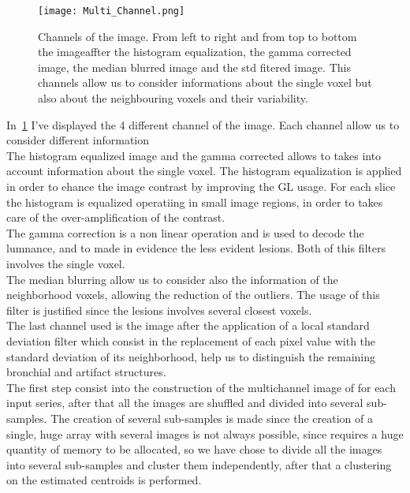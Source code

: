 		\begin{figure}[h]
			\centering
				\texttt{[image: Multi\_Channel.png]}
			\caption{Channels of the image. From left to right and from top to bottom the imageaffter the histogram equalization, the gamma corrected image, the median blurred image and the std fitered image. This channels allow us to consider informations about the single voxel but also about the neighbouring voxels and their variability. }\label{fig:MultiChannel}
		\end{figure}
	
		In \figurename\,\ref{fig:MultiChannel} I've displayed the 4 different channel of the image. Each channel allow us to consider different information\\
		The histogram equalized image and the gamma corrected allows to takes into account information about the single voxel. The histogram equalization is applied in order to ehance the image contrast by improving the GL usage. For each slice the histogram is equalized operatiing in small image regions, in order to takes care of the over-amplification of the contrast.\\ The gamma correction is a non linear operation and is used to decode the lumnance, and to made in evidence the less evident lesions. Both of this filters involves the single voxel.\\The median blurring allow us to consider also the information of the neighborhood voxels, allowing the reduction of the outliers. The usage of this filter is justified since the lesions involves several closest voxels.\\The last channel used is the image after the application of a local standard deviation filter which consist in the replacement of each pixel value with the standard deviation of its neighborhood, help us to distinguish the remaining bronchial and artifact structures.\\
		
		The first step consist into the construction of the multichannel image of for each input series, after that all the images are shuffled and divided into several sub-samples. The creation of several sub-samples is made since the creation of a single, huge array with several images is not always possible, since requires a huge quantity of memory to be allocated, so we have chose to divide all the images into several sub-samples and cluster them independently, after that a clustering on the estimated centroids is performed.\\

